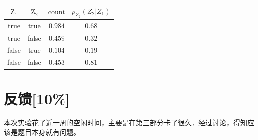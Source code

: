 \documentclass{ctexart}
\begin{document}
	\begin{table}[H]
		\centering
		\begin{tabular}{|c|c|c|c|}
		\hline
		$\text{Z}_1$ & $\text{Z}_2$ & $\text{count}$ & $p_{Z_2}(Z_2|Z_1)$ \\
		\hline
		true & true & $0.984$ & $0.68$ \\
		\hline
		true & false & $0.459$ & $0.32$ \\
		\hline
		false & true & $0.104$ & $0.19$ \\
		\hline
		false & false & $0.453$ & $0.81$ \\
		\hline
		\end{tabular}
	\end{table}	
	\section{反馈[10\%]}
	本次实验花了近一周的空闲时间，主要是在第三部分卡了很久，经过讨论，得知应该是题目本身就有问题。
	
	



	
\end{document}

